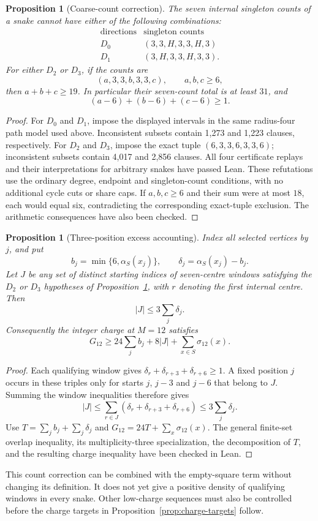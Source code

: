 \documentclass[11pt,a4paper]{article}
\newtheorem{proposition}[theorem]{Proposition}
\theoremstyle{definition}
\theoremstyle{remark}
\begin{document}
\begin{proposition}[Coarse-count correction]\label{prop:coarse-correction}
The seven internal singleton counts of a snake cannot have either of the following combinations:
\[
\begin{array}{c|c}
\text{directions}&\text{singleton counts}\\\hline
D_0&(3,3,H,3,3,H,3)\\
D_1&(3,H,3,3,H,3,3).
\end{array}
\]
For either $D_2$ or $D_3$, if the counts are
\[
(a,3,3,b,3,3,c),\qquad a,b,c\ge6,
\]
then $a+b+c\ge19$. In particular their seven-count total is at least $31$, and
\[
(a-6)+(b-6)+(c-6)\ge1.
\]
\end{proposition}
\begin{proof}
For $D_0$ and $D_1$, impose the displayed intervals in the same radius-four path model used above. Inconsistent subsets contain 1,273 and 1,223 clauses, respectively. For $D_2$ and $D_3$, impose the exact tuple $(6,3,3,6,3,3,6)$; inconsistent subsets contain 4,017 and 2,856 clauses. All four certificate replays and their interpretations for arbitrary snakes have passed Lean. These refutations use the ordinary degree, endpoint and singleton-count conditions, with no additional cycle cuts or share caps. If $a,b,c\ge6$ and their sum were at most $18$, each would equal six, contradicting the corresponding exact-tuple exclusion. The arithmetic consequences have also been checked.
\end{proof}

\begin{proposition}[Three-position excess accounting]\label{prop:three-excess}
Index all selected vertices by $j$, and put
\[
b_j=\min\{6,\alpha_S(x_j)\},\qquad
\delta_j=\alpha_S(x_j)-b_j.
\]
Let $J$ be any set of distinct starting indices of seven-centre windows satisfying the $D_2$ or $D_3$ hypotheses of Proposition~\ref{prop:coarse-correction}, with $r$ denoting the first internal centre. Then
\[
|J|\le3\sum_j\delta_j.
\]
Consequently the integer charge at $M=12$ satisfies
\[
G_{12}\ge24\sum_j b_j+8|J|+\sum_{x\in S}\sigma_{12}(x).
\]
\end{proposition}
\begin{proof}
Each qualifying window gives $\delta_r+\delta_{r+3}+\delta_{r+6}\ge1$. A fixed position $j$ occurs in these triples only for starts $j$, $j-3$ and $j-6$ that belong to $J$. Summing the window inequalities therefore gives
\[
|J|\le\sum_{r\in J}(\delta_r+\delta_{r+3}+\delta_{r+6})
\le3\sum_j\delta_j.
\]
Use $T=\sum_j b_j+\sum_j\delta_j$ and $G_{12}=24T+\sum_x\sigma_{12}(x)$. The general finite-set overlap inequality, its multiplicity-three specialization, the decomposition of $T$, and the resulting charge inequality have been checked in Lean.
\end{proof}
This count correction can be combined with the empty-square term without changing its definition. It does not yet give a positive density of qualifying windows in every snake. Other low-charge sequences must also be controlled before the charge targets in Proposition~\ref{prop:charge-targets} follow.
\end{document}

